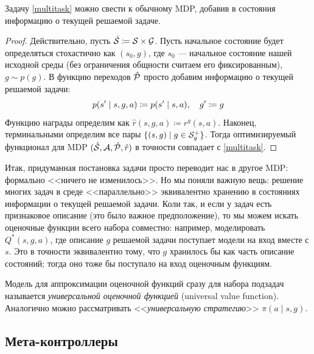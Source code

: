 \begin{theorem}
Задачу \eqref{multitask} можно свести к обычному MDP, добавив в состояния информацию о текущей решаемой задаче.
\begin{proof}
Действительно, пусть $\hat{\mathcal{S}} \coloneqq \mathcal{S} \times \mathcal{G}$. Пусть начальное состояние будет определяться стохастично как $(s_0, g)$, где $s_0$ --- начальное состояние нашей исходной среды (без ограничения общности считаем его фиксированным), $g \sim p(g)$. В функцию переходов $\hat{\mathcal{P}}$ просто добавим информацию о текущей решаемой задачи:
\begin{equation}\label{transition_indep_from_goal}
p(s' \mid s, g, a) \coloneqq p(s' \mid s, a), \quad g' \HM\coloneqq g
\end{equation} 
Функцию награды определим как $\hat{r}(s, g, a) \coloneqq r^g(s, a)$. Наконец, терминальными определим все пары $\{ (s, g) \mid g \in \mathcal{S}^+_g\}$. Тогда оптимизируемый функционал для MDP $(\hat{\mathcal{S}}, \mathcal{A}, \hat{\mathcal{P}}, \hat{r})$ в точности совпадает с \eqref{multitask}.
\end{proof}
\end{theorem}

Итак, придуманная постановка задачи просто переводит нас в другое MDP: формально <<ничего не изменилось>>. Но мы поняли важную вещь: решение многих задач в среде <<параллельно>> эквивалентно хранению в состояниях информации о текущей решаемой задачи. Коли так, и если у задач есть признаковое описание (это было важное предположение), то мы можем искать оценочные функции всего набора совместно: например, моделировать $Q^*(s, g, a)$, где описание $g$ решаемой задачи поступает модели на вход вместе с $s$. Это в точности эквивалентно тому, что $g$ хранилось бы как часть описание состояний; тогда оно тоже бы поступало на вход оценочным функциям.

\begin{definition}
Модель для аппроксимации оценочной функций сразу для набора подзадач называется \emph{универсальной оценочной функцией} (universal value function). Аналогично можно рассматривать <<\emph{универсальную стратегию}>> $\pi(a \mid s, g)$.
\end{definition}

\subsection{Мета-контроллеры}

